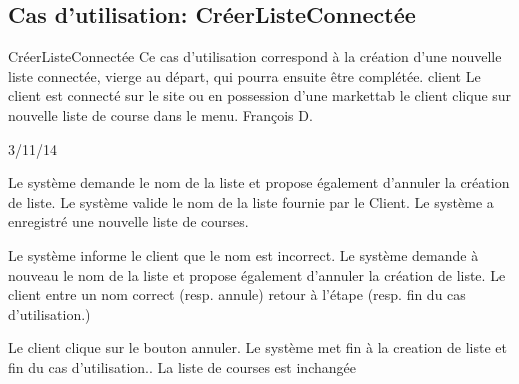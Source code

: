 \subsection{Cas d'utilisation: CréerListeConnectée}

\startCU
\nom CréerListeConnectée
\but Ce cas d’utilisation correspond à la création d’une nouvelle liste connectée, vierge au départ, qui pourra ensuite être complétée.
\acteur client
\precondition Le client est connecté sur le site ou en possession d'une markettab
\declenchement le client clique sur nouvelle liste de course dans le menu.
\auteur François D.
\date 03/11/14

\nominal %
\startnominal
\etape[ANNUL] Le système demande le nom de la liste et propose également d'annuler la création de liste.
\etape[NOMINVAL] Le système valide le nom de la liste fournie par le Client.
\stopnominal
\postcondition Le système a enregistré une nouvelle liste de courses.

\alternatifs %
\startalternatif[NOMINVAL] %
  \etape Le système informe le client que le nom est incorrect.
  \etape Le système demande à nouveau le nom de la liste et propose également d'annuler la création de liste.
  \etape Le client entre un nom correct (resp. annule)
  \etape retour à l'étape \in[NOMINVAL](resp. fin du cas d'utilisation.\in[RETOURDL])
\stopcondition
\stopalternatif

\exception %
\startalternatif[ANNUL]
  \etape Le client clique sur le bouton annuler.
  \etape Le système met fin à la creation de liste et fin du cas d'utilisation.\in[RETOURDL].
\stopcondition
\postcondition La liste de courses est inchangée
\stopalternatif
\stopCU
